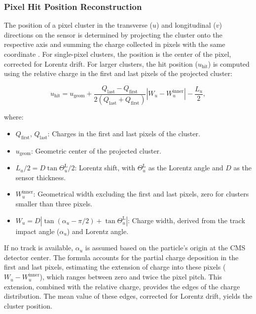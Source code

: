 \subsubsection{Pixel Hit Position Reconstruction}

The position of a pixel cluster in the transverse (\(u\)) and longitudinal (\(v\)) directions on the sensor is determined by projecting the cluster onto the respective axis and summing the charge collected in pixels with the same coordinate \cite{Tracking_2014}. For single-pixel clusters, the position is the center of the pixel, corrected for Lorentz drift. For larger clusters, the hit position (\(u_{\text{hit}}\)) is computed using the relative charge in the first and last pixels of the projected cluster:

\begin{equation}
u_{\text{hit}} = u_{\text{geom}} + \frac{Q_{\text{last}} - Q_{\text{first}}}{2(Q_{\text{last}} + Q_{\text{first}})} |W_u - W_u^{\text{inner}}| - \frac{L_u}{2},
\end{equation}

where:
\begin{itemize}
    \item \(Q_{\text{first}}\), \(Q_{\text{last}}\): Charges in the first and last pixels of the cluster.
    \item \(u_{\text{geom}}\): Geometric center of the projected cluster.
    \item \(L_u/2 = D \tan \Theta_u^{\text{L}}/2\): Lorentz shift, with \(\Theta_u^{\text{L}}\) as the Lorentz angle and \(D\) as the sensor thickness.
    \item \(W_u^{\text{inner}}\): Geometrical width excluding the first and last pixels, zero for clusters smaller than three pixels.
    \item \(W_u = D \left| \tan (\alpha_u - \pi/2) + \tan \Theta_u^{\text{L}} \right|\): Charge width, derived from the track impact angle (\(\alpha_u\)) and Lorentz angle.
\end{itemize}

If no track is available, \(\alpha_u\) is assumed based on the particle's origin at the CMS detector center. The formula accounts for the partial charge deposition in the first and last pixels, estimating the extension of charge into these pixels (\(W_u - W_u^{\text{inner}}\)), which ranges between zero and twice the pixel pitch. This extension, combined with the relative charge, provides the edges of the charge distribution. The mean value of these edges, corrected for Lorentz drift, yields the cluster position.

